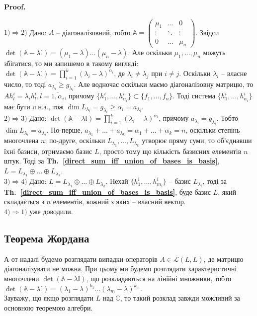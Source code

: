 \documentclass[a4paper, 10pt]{article}
\makeatletter
\theoremstyle{theoremdd}
\newcommand\thref[1]{\textbf{Th.~\ref{#1}}}
\renewenvironment{proof}[1][Proof.\\]{\par
\pushQED{\hfill \qed}%
\normalfont \topsep6\p@\@plus6\p@\relax
\trivlist
\item\relax
{\bfseries
#1\@addpunct{.}}\hspace\labelsep\ignorespaces
}{%
\popQED\endtrivlist\@endpefalse
}
\makeatother
\begin{document}
\begin{proof}
$\boxed{1) \Rightarrow 2)}$ Дано: $A$ -- діагоналізовний, тобто $\mathbb{A} = \begin{pmatrix}
\mu_1 & \dots & 0 \\
\vdots & \ddots & \vdots \\
0 & \dots & \mu_n
\end{pmatrix}$. Звідси $\det (\mathbb{A}-\lambda \mathbb{I}) = (\mu_1 - \lambda) \dots (\mu_n - \lambda)$. Але оскільки $\mu_1,\dots,\mu_n$ можуть збігатися, то ми запишемо в такому вигляді:\\
$\det (\mathbb{A}-\lambda \mathbb{I}) = \displaystyle\prod_{i=1}^k (\lambda_i - \lambda)^{\alpha_i}$, де $\lambda_i \neq \lambda_j$ при $i \neq j$. Оскільки $\lambda_i$ -- власне число, то тоді $a_{\lambda_i} \geq g_{\lambda_i}$. Але водночас оскільки маємо діагоналізовну матрицю, то $Ah^{i}_l = \lambda_i h^{i}_l, l = \overline{1,\alpha_i}$, причому $\{h^{i}_1,\dots,h^{i}_{\alpha_i}\} \subset \{f_1,\dots,f_n\}$. Тоді система $\{h^{i}_1,\dots,h^{i}_{\alpha_i}\}$ має бути л.н.з., тож $\dim L_{\lambda_i} = g_{\lambda_i} \geq \alpha_i = a_{\lambda_i}$.
\bigskip \\
$\boxed{2) \Rightarrow 3)}$ Дано: $\det (\mathbb{A}-\lambda \mathbb{I}) = \displaystyle\prod_{i=1}^k (\lambda_i - \lambda)^{\alpha_i}$, причому $a_{\lambda_i} = g_{\lambda_i}$. Тобто $\dim L_{\lambda_i} = a_{\lambda_i}$. По-перше, $a_{\lambda_1} + \dots + a_{\lambda_k} = \alpha_1 + \dots + \alpha_k = n$, оскільки степінь многочлена $n$; по-друге, оскільки $L_{\lambda_1},\dots, L_{\lambda_k}$ утворює пряму суми, то об'єднавши їхні базиси, отримаємо базис $L$, просто тому що кількість базисних елементів $n$ штук. Тоді за \thref{direct_sum_iff_union_of_bases_is_basis}, $L = L_{\lambda_1} \oplus \dots \oplus L_{\lambda_k}$.
\bigskip \\
$\boxed{3) \Rightarrow 4)}$ Дано: $L = L_{\lambda_1} \oplus \dots \oplus L_{\lambda_k}$. Нехай $\{h_1^i,\dots,h^i_{m_i}\}$ -- базис $L_{\lambda_i}$, тоді за \thref{direct_sum_iff_union_of_bases_is_basis}, буде базис $L$, який складається з $n$ елементів, кожний з яких -- власний вектор.
\bigskip \\
$\boxed{4) \Rightarrow 1)}$ уже доводили.
\end{proof}

\subsection{Теорема Жордана}
А от надалі будемо розглядати випадки операторів $A \in \mathcal{L}(L,L)$, де матрицю діагоналізувати не можна. При цьому ми будемо розглядати характеристичні многочлени $\det (\mathbb{A}-\lambda \mathbb{I})$, що розкладаються на лінійні множники, тобто\\
$\det (\mathbb{A}-\lambda \mathbb{I}) = (\lambda_1 - \lambda)^{k_1} \dots (\lambda_m - \lambda)^{k_m}$.\\
Зауважу, що якщо розглядати $L$ над $\mathbb{C}$, то такий розклад завжди можливий за основною теоремою алгебри.
\end{document}
